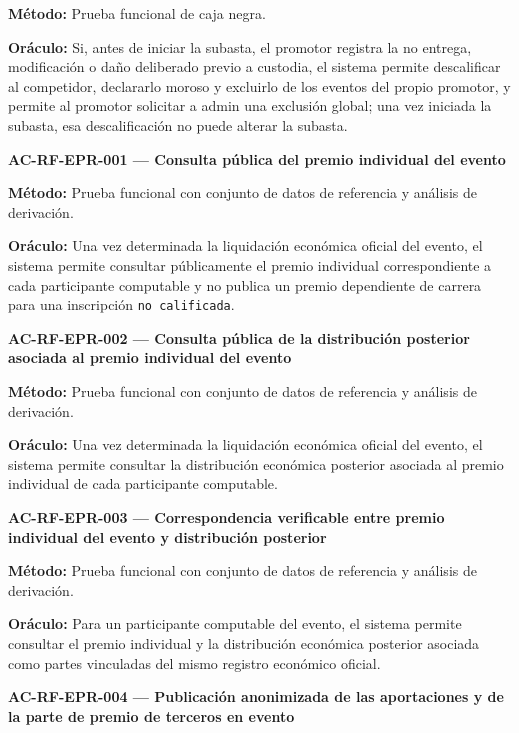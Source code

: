 \documentclass[10pt,letterpaper]{article}
\begin{document}
\textbf{Método:} Prueba funcional de caja negra.\par
\textbf{Oráculo:} Si, antes de iniciar la subasta, el promotor registra la no entrega, modificación o daño deliberado previo a custodia, el sistema permite descalificar al competidor, declararlo moroso y excluirlo de los eventos del propio promotor, y permite al promotor solicitar a admin una exclusión global; una vez iniciada la subasta, esa descalificación no puede alterar la subasta.\par\vspace{0.45em}
\noindent\textbf{AC-RF-EPR-001 --- Consulta pública del premio individual del evento}\par
\textbf{Método:} Prueba funcional con conjunto de datos de referencia y análisis de derivación.\par
\textbf{Oráculo:} Una vez determinada la liquidación económica oficial del evento, el sistema permite consultar públicamente el premio individual correspondiente a cada participante computable y no publica un premio dependiente de carrera para una inscripción \texttt{no calificada}.\par\vspace{0.45em}
\noindent\textbf{AC-RF-EPR-002 --- Consulta pública de la distribución posterior asociada al premio individual del evento}\par
\textbf{Método:} Prueba funcional con conjunto de datos de referencia y análisis de derivación.\par
\textbf{Oráculo:} Una vez determinada la liquidación económica oficial del evento, el sistema permite consultar la distribución económica posterior asociada al premio individual de cada participante computable.\par\vspace{0.45em}
\noindent\textbf{AC-RF-EPR-003 --- Correspondencia verificable entre premio individual del evento y distribución posterior}\par
\textbf{Método:} Prueba funcional con conjunto de datos de referencia y análisis de derivación.\par
\textbf{Oráculo:} Para un participante computable del evento, el sistema permite consultar el premio individual y la distribución económica posterior asociada como partes vinculadas del mismo registro económico oficial.\par\vspace{0.45em}
\noindent\textbf{AC-RF-EPR-004 --- Publicación anonimizada de las aportaciones y de la parte de premio de terceros en evento}\par
\end{document}
